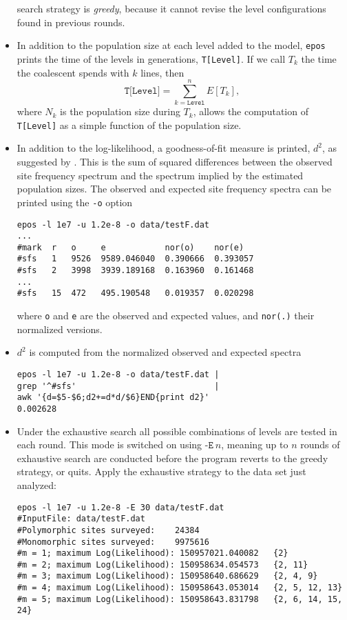 \documentclass[a4paper, english]{article}
\newcommand{\ty}{\texttt}
\begin{document}
\begin{itemize}
search strategy is \emph{greedy}, because it cannot revise the level
configurations found in previous rounds.
\item In addition to the population size at each level added to the model, \ty{epos}
  prints the time of the levels in generations, \ty{T[Level]}. If we call $T_k$ the
  time the coalescent spends with $k$ lines, then
  \[
  \ty{T[Level]} = \sum_{k=\ty{Level}}^n E[T_k],
    \]
  where $N_k$ is the population size during $T_k$,
  allows the computation of \ty{T[Level]} as a simple function of the
  population size.
\item In addition to the log-likelihood, a goodness-of-fit measure is
  printed, $d^2$, as suggested by \cite{lap17:acc}. This is the sum of
  squared differences between the observed site frequency spectrum and
  the spectrum implied by the estimated population sizes. The observed
  and expected site frequency spectra can be printed using the \ty{-o}
  option
\begin{verbatim}
epos -l 1e7 -u 1.2e-8 -o data/testF.dat 
...
#mark  r   o     e            nor(o)    nor(e)
#sfs   1   9526  9589.046040  0.390666  0.393057
#sfs   2   3998  3939.189168  0.163960  0.161468
...
#sfs   15  472   495.190548   0.019357  0.020298
\end{verbatim}
where \ty{o} and \ty{e} are the observed and expected values, and
\ty{nor(.)} their normalized versions.
\item $d^2$ is computed from the normalized observed and expected
  spectra
\begin{verbatim}
epos -l 1e7 -u 1.2e-8 -o data/testF.dat | 
grep '^#sfs'                            | 
awk '{d=$5-$6;d2+=d*d/$6}END{print d2}'
0.002628
\end{verbatim}
\item Under the exhaustive search all possible combinations of levels are tested in each
round. This mode is switched on using $\ty{-E}\ n$, meaning up to $n$
rounds of exhaustive search are conducted before the program reverts
to the greedy strategy, or quits. Apply the exhaustive strategy to the
data set just analyzed:
\begin{verbatim}
epos -l 1e7 -u 1.2e-8 -E 30 data/testF.dat 
#InputFile:	data/testF.dat
#Polymorphic sites surveyed:	24384
#Monomorphic sites surveyed:	9975616
#m = 1; maximum Log(Likelihood): 150957021.040082	{2}
#m = 2; maximum Log(Likelihood): 150958634.054573	{2, 11}
#m = 3; maximum Log(Likelihood): 150958640.686629	{2, 4, 9}
#m = 4; maximum Log(Likelihood): 150958643.053014	{2, 5, 12, 13}
#m = 5; maximum Log(Likelihood): 150958643.831798	{2, 6, 14, 15, 24}

\end{verbatim}
\end{itemize}
\end{document}

